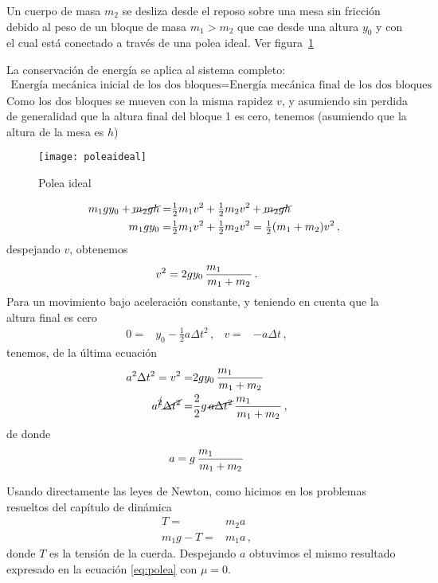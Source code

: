 \example{}
\label{ex:polea}


 Un cuerpo de masa $m_2$ se desliza desde el
  reposo sobre una mesa sin fricción debido al peso de un bloque de
  masa $m_1>m_2$ que cae desde una altura $y_0$ y con el cual está
  conectado a través de una polea ideal. Ver figura~\ref{fig:poleaideale}

La conservación de energía se aplica al sistema completo:
\begin{align}
  \text{Energía mecánica inicial de los dos bloques}=
\text{Energía mecánica final de los dos bloques}
\end{align}
Como los dos bloques se mueven con la misma rapidez $v$, y asumiendo
sin perdida de generalidad que la altura final del bloque 1 es cero,
tenemos (asumiendo que la altura de la mesa es $h$)

\begin{frame}
  \begin{figure}
    \centering
    \texttt{[image: poleaideal]}
    \caption{Polea ideal}
    \label{fig:poleaideale}
  \end{figure}
\end{frame}

\begin{frame}
\begin{align*}
  m_1gy_0+\cancel{m_2gh}=&\tfrac{1}{2}m_1 v^2+\tfrac{1}{2}m_2 v^2+\cancel{m_2gh}\phantom{\color{red}+Q}\nonumber\\
 \phantom{\color{red}-\mu m_2 g y_0+}m_1gy_0=&\tfrac{1}{2}m_1 v^2+\tfrac{1}{2}m_2 v^2
  =\tfrac{1}{2}(m_1+m_2) v^2\,,
\end{align*}
despejando $v$, obtenemos
\begin{align*}
  v^2=2gy_0\,\frac{m_1\phantom{\color{red}-\mu m_2}}{m_1+m_2}\,.
\end{align*}
Para un movimiento bajo aceleración constante, y teniendo en cuenta que la altura final es cero
\begin{align*}
  0=&y_0-\tfrac{1}{2}a\Delta t^2\,,&
  v=&-a\Delta t\,,
\end{align*}
tenemos, de la última ecuación
\begin{align*}
  a^2 \Delta t^2=v^2
  =&2gy_0\,\frac{m_1\phantom{\color{red}-\mu m_2}}{m_1+m_2}\nonumber\\
  a^{\cancel{2}} \cancel{\Delta t^2}=&\frac{2}{2}g\,\cancel{a\Delta t^2}\,\frac{m_1\phantom{\color{red}-\mu m_2}}{m_1+m_2}\,,
\end{align*}
de donde
\begin{align}
\label{eq:acelfin}
  a=g\,\frac{m_1\phantom{\color{red}-\mu m_2}}{m_1+m_2}
\end{align}

\end{frame}
Usando directamente las leyes de Newton, como hicimos en los problemas resueltos del capítulo de dinámica
\begin{align}
  T=&m_2 a\nonumber\\
m_1g-T=&m_1 a\,,
\end{align}
donde $T$ es la tensión de la cuerda. Despejando $a$ obtuvimos el mismo resultado expresado en la ecuación \eqref{eq:polea} con $\mu=0$.




